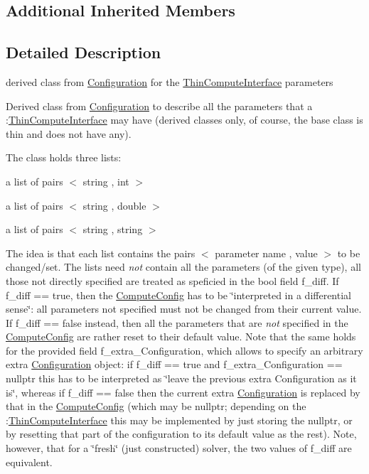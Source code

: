 \subsection*{Additional Inherited Members}


\subsection{Detailed Description}
derived class from \mbox{\hyperlink{class_s_m_spp__di__unipi__it_1_1_configuration}{Configuration}} for the \mbox{\hyperlink{class_s_m_spp__di__unipi__it_1_1_thin_compute_interface}{Thin\+Compute\+Interface}} parameters 

Derived class from \mbox{\hyperlink{class_s_m_spp__di__unipi__it_1_1_configuration}{Configuration}} to describe all the parameters that a \+:\mbox{\hyperlink{class_s_m_spp__di__unipi__it_1_1_thin_compute_interface}{Thin\+Compute\+Interface}} may have (derived classes only, of course, the base class is thin and does not have any).

The class holds three lists\+:


\begin{DoxyItemize}
\item a list of pairs $<$ string , int $>$
\item a list of pairs $<$ string , double $>$
\item a list of pairs $<$ string , string $>$
\end{DoxyItemize}

The idea is that each list contains the pairs $<$ parameter name , value $>$ to be changed/set. The lists need {\itshape not} contain all the parameters (of the given type), all those not directly specified are treated as speficied in the bool field f\+\_\+diff. If f\+\_\+diff == true, then the \mbox{\hyperlink{class_s_m_spp__di__unipi__it_1_1_compute_config}{Compute\+Config}} has to be \char`\"{}interpreted in a differential sense\char`\"{}\+: all parameters not specified must not be changed from their current value. If f\+\_\+diff == false instead, then all the parameters that are {\itshape not} specified in the \mbox{\hyperlink{class_s_m_spp__di__unipi__it_1_1_compute_config}{Compute\+Config}} are rather reset to their default value. Note that the same holds for the provided field f\+\_\+extra\+\_\+\+Configuration, which allows to specify an arbitrary extra \mbox{\hyperlink{class_s_m_spp__di__unipi__it_1_1_configuration}{Configuration}} object\+: if f\+\_\+diff == true and f\+\_\+extra\+\_\+\+Configuration == nullptr this has to be interpreted as \char`\"{}leave the previous extra
\+Configuration as it is\char`\"{}, whereas if f\+\_\+diff == false then the current extra \mbox{\hyperlink{class_s_m_spp__di__unipi__it_1_1_configuration}{Configuration}} is replaced by that in the \mbox{\hyperlink{class_s_m_spp__di__unipi__it_1_1_compute_config}{Compute\+Config}} (which may be nullptr; depending on the \+:\mbox{\hyperlink{class_s_m_spp__di__unipi__it_1_1_thin_compute_interface}{Thin\+Compute\+Interface}} this may be implemented by just storing the nullptr, or by resetting that part of the configuration to its default value as the rest). Note, however, that for a \char`\"{}fresh\char`\"{} (just constructed) solver, the two values of f\+\_\+diff are equivalent.

